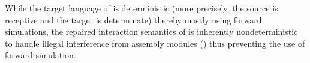 While the target language of \cc{} is deterministic (more precisely,
the source is receptive and the target is determinate) thereby mostly
using forward simulations, the repaired interaction semantics of
\ccm{} is inherently nondeterministic to handle illegal interference from assembly modules
() thus preventing the
use of forward simulation.

